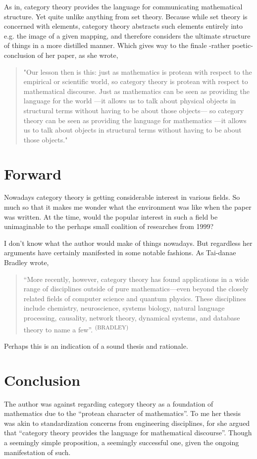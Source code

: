 As in, category theory provides the language for communicating mathematical structure. Yet quite unlike anything from set theory. Because while set theory is concerned with elements, category theory abstracts such elements entirely into e.g. the image of a given mapping, and therefore considers the ultimate structure of things in a more distilled manner. Which gives way to the finale -rather poetic- conclusion of her paper, as she wrote,

\begin{quotation}
"Our lesson then is this: just as mathematics is protean with respect to the empirical or scientific world, so category theory is protean with respect to mathematical discourse. Just as mathematics can be seen as providing the language for the world —it allows us to talk about physical objects in structural terms without having to be about those objects— so category theory can be seen as providing the language for mathematics —it allows us to talk about objects in structural terms without having to be about those objects."
\end{quotation}

\section*{Forward}

Nowadays category theory is getting considerable interest in various fields. So much so that it makes me wonder what the environment was like when the paper was written. At the time, would the popular interest in such a field be unimaginable to the perhaps small coalition of researches from 1999? 

I don’t know what the author would make of things nowadays. But regardless her arguments have certainly manifested in some notable fashions. As Tai-danae Bradley wrote,
\begin{quotation}
“More recently, however, category theory has found applications in a wide range of disciplines outside of pure mathematics—even beyond the closely related fields of computer science and quantum physics. These disciplines include chemistry, neuroscience, systems biology, natural language processing, causality, network theory, dynamical systems, and database theory to name a few”. \textsuperscript{(BRADLEY)}
\end{quotation}

Perhaps this is an indication of a sound thesis and rationale. 


\section*{Conclusion}

The author was against regarding category theory as a foundation of mathematics due to the “protean character of mathematics”. To me her thesis was akin to standardization concerns from engineering disciplines, for she argued that “category theory provides the language for mathematical discourse”. Though a seemingly simple proposition, a seemingly successful one, given the ongoing manifestation of such.
